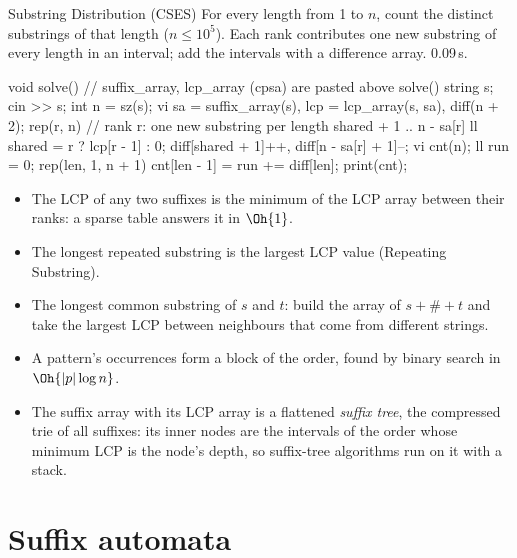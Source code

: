 \begin{problem}{Substring Distribution (CSES)}
For every length from 1 to $n$, count the distinct substrings of that length ($n \le 10^5$).
\solution Each rank contributes one new substring of every length in an interval; add the intervals with a difference array. 0.09\,s.
\end{problem}

\begin{code}
void solve() {  // suffix_array, lcp_array (cpsa) are pasted above solve()
    string s;
    cin >> s;
    int n = sz(s);
    vi sa = suffix_array(s), lcp = lcp_array(s, sa), diff(n + 2);
    rep(r, n) {  // rank r: one new substring per length shared + 1 .. n - sa[r]
        ll shared = r ? lcp[r - 1] : 0;
        diff[shared + 1]++, diff[n - sa[r] + 1]--;
    }
    vi cnt(n);
    ll run = 0;
    rep(len, 1, n + 1) cnt[len - 1] = run += diff[len];
    print(cnt);
}
\end{code}

\begin{trick}
\begin{itemize}
  \item The LCP of any two suffixes is the minimum of the LCP array between their ranks: a sparse table answers it in $\Oh{1}$.
  \item The longest repeated substring is the largest LCP value (Repeating Substring).
  \item The longest common substring of $s$ and $t$: build the array of $s + \# + t$ and take the largest LCP between neighbours that come
        from different strings.
  \item A pattern's occurrences form a block of the order, found by binary search in $\Oh{|p| \log n}$.
  \item The suffix array with its LCP array is a flattened \emph{suffix tree}, the compressed trie of all suffixes: its inner nodes are the
        intervals of the order whose minimum LCP is the node's depth, so suffix-tree algorithms run on it with a stack.
\end{itemize}
\end{trick}

\section[Suffix automata]{Suffix automata \hfill \ioi}\label{sec:sam}

